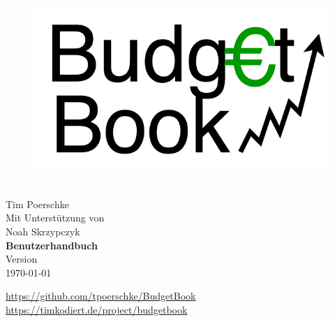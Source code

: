 
\begin{center}
	\begin{figure}[H]
		\center
		\includegraphics[scale=0.4]{img/logo}
	\end{figure}
	\APPNAME \\
	Tim Poerschke \\
	\vspace{.5cm}
	{\footnotesize Mit Unterstützung von \\ Noah Skrzypczyk} \\
	\vspace{2cm}
	\textbf{\LARGE
		Benutzerhandbuch
	}\\	
	\vspace{2cm}
	Version \APPVERSION \\
	\today
\end{center}

\vfill

\url{https://github.com/tpoerschke/BudgetBook} \\
\url{https://timkodiert.de/project/budgetbook}
